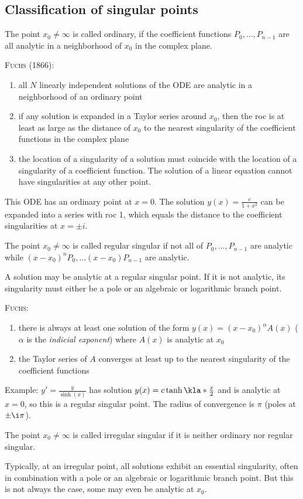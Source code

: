 \documentclass[english, parskip=full]{scrbook}
\newcommand{\definition}[2]{\begin{tcolorbox}[colback=colorbackgrounddefinition,colframe=colordefinition, breakable,enhanced,title=\textbf{#1}.]#2\end{tcolorbox}}
\newcommand{\note}[1]{\begin{tcolorbox}[colback=colorbackgroundnote,colframe=colornote, breakable,enhanced]#1\end{tcolorbox}}
\newcommand{\example}[3]{\begin{tcolorbox}[colback=colorbackgroundexample,colframe=colorexample, breakable,enhanced,title={\textbf{#1}: #2.}]#3\end{tcolorbox}}
\begin{document}
\subsection{Classification of singular points}
\definition{Ordinary Points}{The point $x_0\neq \infty$ is called ordinary, if the coefficient functions $P_0,\dots,P_{n-1}$ are all analytic in a neighborhood of $x_0$ in the complex plane.

\textsc{Fuchs} (1866):
\begin{enumerate}
\item all $N$ linearly independent solutions of the ODE are analytic in a neighborhood of an ordinary point
\item if any solution is expanded in a Taylor series around $x_0$, then the \gls{roc} is at least as large as the distance of $x_0$ to the nearest singularity of the coefficient functions in the complex plane
\item the location of a singularity of a solution must coincide with the location of a singularity of a coefficient function. The solution of a linear equation cannot have singularities at any other point.
\end{enumerate}
}
\example{Linear}{$\kla*{x^2+1}y'+2xy=0$}{This ODE has an ordinary point at $x=0$.
The solution $y(x)=\frac{c}{1+x^2}$ can be expanded into a series with \gls{roc} 1, which equals the distance to the coefficient singularities at $x=\pm i$.
}
\definition{Regular Singular Points}{The point $x_0\neq\infty$ is called regular singular if not all of $P_0,\dots,P_{n-1}$ are analytic while $(x-x_0)^nP_0,\dots (x-x_0)P_{n-1}$ are analytic.
\note{A solution may be analytic at a regular singular point. If it is not analytic, its singularity must either be a pole or an algebraic or logarithmic branch point.}
\textsc{Fuchs}:
\begin{enumerate}
\item there is always at least one solution of the form $y(x)=(x-x_0)^\alpha A(x)$ ($\alpha$ is the \emph{indicial exponent}) where $A(x)$ is analytic at $x_0$
\item the Taylor series of $A$ converges at least up to the nearest singularity of the coefficient functions
\end{enumerate}
\note{Example: $y'=\frac{y}{\sinh(x)}$ has solution $y(x)=c\tanh\kla*{\frac{x}{2}}$ and is analytic at $x=0$, so this is a regular singular point.
The radius of convergence is $\pi$ (poles at $\pm \i\pi$).}
}
\definition{Irregular Singular Points}{The point $x_0\neq \infty$ is called irregular singular if it is neither ordinary nor regular singular.
\note{Typically, at an irregular point, all solutions exhibit an essential singularity, often in combination with a pole or an algebraic or logarithmic branch point. But this is not always the case, some may even be analytic at $x_0$.}
}
\end{document}
